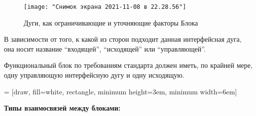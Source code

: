 \documentclass[a4paper]{article}
\begin{document}
	\begin{figure}[h]
		\centering
		\texttt{[image: "Снимок экрана 2021-11-08 в 22.28.56"]}
		\caption{Дуги, как ограничивающие и уточняющие факторы Блока}
		\label{fig:--2021-11-08--22}
	\end{figure}
	
	В зависимости от того, к какой из сторон подходит данная интерфейсная дуга, она носит название “входящей”, “исходящей” или “управляющей”.
	
	Функциональный блок по требованиям стандарта должен иметь, по крайней мере, одну управляющую интерфейсную дугу и одну исходящую.
	
	 = [draw, fill=white, rectangle, 
	minimum height=3em, minimum width=6em]
	
	\textbf{Типы взаимосвязей между блоками:}
\end{document}
